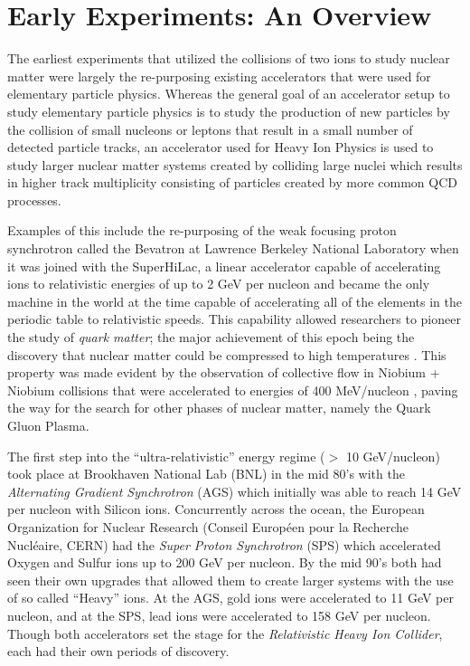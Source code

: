 \section{Early Experiments: An Overview}
The earliest experiments that utilized the collisions of two ions to study nuclear matter were largely the re-purposing existing accelerators that were used for elementary particle physics. Whereas the general goal of an accelerator setup to study elementary particle physics is to study the production of new particles by the collision of small nucleons or leptons that result in a small number of detected particle tracks, an accelerator used for Heavy Ion Physics is used to study larger nuclear matter systems created by colliding large nuclei which results in higher track multiplicity consisting of particles created by more common QCD processes. 

Examples of this include the re-purposing of the weak focusing proton synchrotron called the Bevatron at Lawrence Berkeley National Laboratory when it was joined with the SuperHiLac, a linear accelerator capable of accelerating ions to relativistic energies of up to 2 GeV per nucleon and became the only machine in the world at the time capable of accelerating all of the elements in the periodic table to relativistic speeds. This capability allowed researchers to pioneer the study of \textit{quark matter}\citep{bevalac9lives}; the major achievement of this epoch being the discovery that nuclear matter could be compressed to high temperatures \citep{ROBINSON857}. This property was made evident by the observation of collective flow in Niobium + Niobium collisions that were accelerated to energies of 400 MeV/nucleon \citep{PhysRevLett.52.1590}, paving the way for the search for other phases of nuclear matter, namely the Quark Gluon Plasma.

The first step into the ``ultra-relativistic'' energy regime ($>$ 10 GeV/nucleon) took place at Brookhaven National Lab (BNL) in the mid 80's with the \textit{Alternating Gradient Synchrotron} (AGS) which initially was able to reach 14 GeV per nucleon with Silicon ions. Concurrently across the ocean, the European Organization for Nuclear Research (Conseil Européen pour la Recherche Nucl\'{e}aire, CERN) had the \textit{Super Proton Synchrotron} (SPS) which accelerated Oxygen and Sulfur ions up to 200 GeV per nucleon. By the mid 90's both had seen their own upgrades that allowed them to create larger systems with the use of so called ``Heavy'' ions. At the AGS, gold ions were accelerated to 11 GeV per nucleon, and at the SPS, lead ions were accelerated to 158 GeV per nucleon\citep{wojciechphenomenology}. Though both accelerators set the stage for the \textit{Relativistic Heavy Ion Collider}, each had their own periods of discovery. 


